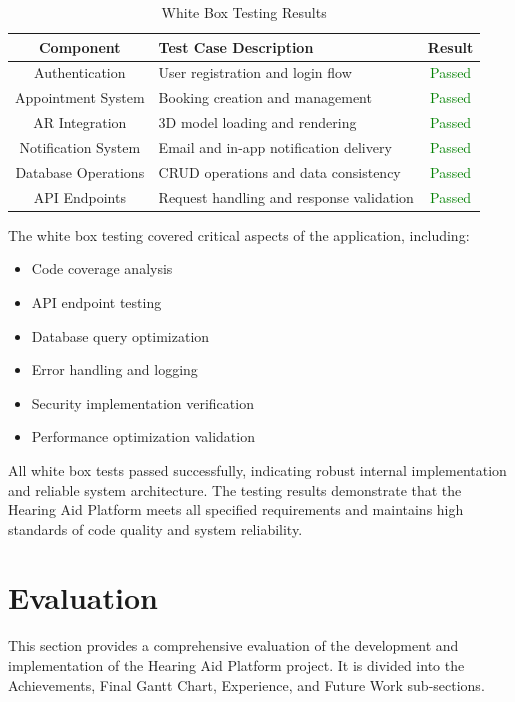 \documentclass{article}
\begin{document}
\begin{table}[H]
\centering
\label{tab:whitebox-testing}
\begin{tabular}{|c|p{6cm}|c|}
\hline
\textbf{Component} & \textbf{Test Case Description} & \textbf{Result} \\ \hline
Authentication & User registration and login flow & \textcolor{green}{Passed} \\ \hline
Appointment System & Booking creation and management & \textcolor{green}{Passed} \\ \hline
AR Integration & 3D model loading and rendering & \textcolor{green}{Passed} \\ \hline
Notification System & Email and in-app notification delivery & \textcolor{green}{Passed} \\ \hline
Database Operations & CRUD operations and data consistency & \textcolor{green}{Passed} \\ \hline
API Endpoints & Request handling and response validation & \textcolor{green}{Passed} \\ \hline
\end{tabular}
\caption{White Box Testing Results}
\label{tab:whitebox-testing}
\end{table}

The white box testing covered critical aspects of the application, including:
\begin{itemize}
    \item Code coverage analysis
    \item API endpoint testing
    \item Database query optimization
    \item Error handling and logging
    \item Security implementation verification
    \item Performance optimization validation
\end{itemize}

All white box tests passed successfully, indicating robust internal implementation and reliable system architecture. The testing results demonstrate that the Hearing Aid Platform meets all specified requirements and maintains high standards of code quality and system reliability.

\newpage

\fancyhead[L]{} 

\section{Evaluation}
This section provides a comprehensive evaluation of the development and implementation of the Hearing Aid Platform project. It is divided into the Achievements, Final Gantt Chart, Experience, and Future Work sub-sections.
\end{document}
